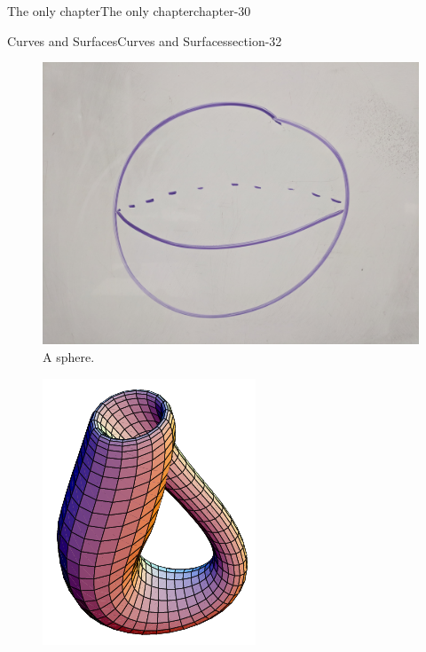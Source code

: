 \documentclass[oneside,10pt,]{book}
\begin{document}
\begin{chapterptx}{The only chapter}{}{The only chapter}{}{}{chapter-30}
\begin{sectionptx}{Curves and Surfaces}{}{Curves and Surfaces}{}{}{section-32}
\begin{figure}
\includegraphics[width=1\linewidth]{images/sphere.jpg}
\caption{A sphere.\label{figure-118}}
\end{figure}
\begin{figure}
\centering
\includegraphics[width=1\linewidth]{images/klein-bottle.png}

\end{figure}
\end{sectionptx}
\end{chapterptx}
\end{document}
